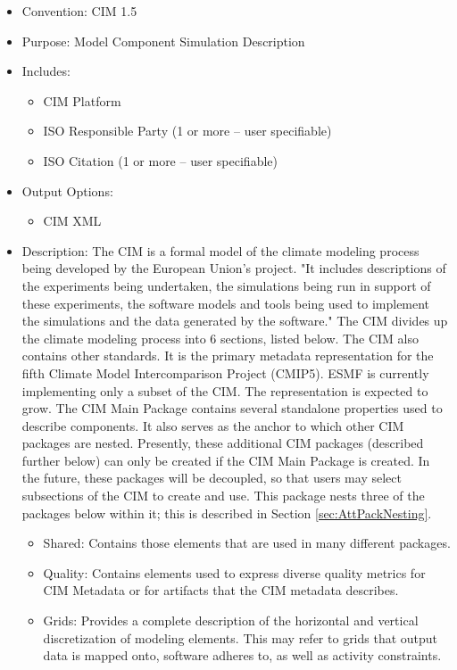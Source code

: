 \begin{itemize}
    \item Convention: CIM 1.5
    \item Purpose: Model Component Simulation Description
    \item Includes:
    \begin{itemize}
       \item CIM Platform
       \item ISO Responsible Party (1 or more -- user specifiable)
       \item ISO Citation (1 or more -- user specifiable)
    \end{itemize}
    \item Output Options: 
    \begin{itemize}
        \item CIM XML
    \end{itemize}  
    \item Description: The CIM is a formal model of the climate modeling process being developed by the European Union's  project. "It includes descriptions of the experiments being undertaken, the simulations being run in support of these experiments, the software models and tools being used to implement the simulations and the data generated by the software." The CIM divides up the climate modeling process into 6 sections, listed below. The CIM also contains other standards. It is the primary metadata representation for the fifth Climate Model Intercomparison Project (CMIP5). ESMF is currently implementing only a subset of the CIM. The representation is expected to grow. The CIM Main Package contains several standalone properties used to describe components. It also serves as the anchor to which other CIM packages are nested. Presently, these additional CIM packages (described further below) can only be created if the CIM Main Package is created. In the future, these packages will be decoupled, so that users may select subsections of the CIM to create and use. This package nests three of the packages below within it; this is described in Section \ref{sec:AttPackNesting}.
    \begin{itemize}
       \item Shared: Contains those elements that are used in many different packages. 
       \item Quality: Contains elements used to express diverse quality metrics for CIM Metadata or for artifacts that the CIM metadata describes.
       \item Grids: Provides a complete description of the horizontal and vertical discretization of modeling elements. This may refer to grids that output data is mapped onto, software adheres to, as well as activity constraints. 

\end{itemize}
\end{itemize}

